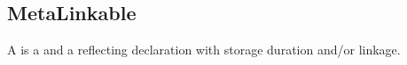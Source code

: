 \subsection{MetaLinkable}
\label{concept-MetaLinkable}

A  is a  and a  reflecting declaration with storage duration and/or linkage. 




